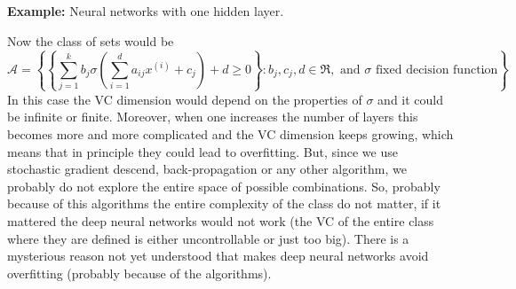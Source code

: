 \documentclass[11pt, english]{article}
\newcommand{\su}[2]{\sum\limits_{#1}^{#2}}
\begin{document}
\textbf{Example:} Neural networks with one hidden layer. \\

Now the class of sets would be 
\begin{equation}
	\mathcal{A}=\left\{\left\{\su{j=1}{k} b_j \sigma\left(\su{i=1}{d}a_{ij}x^{(i)}+c_j\right)+d\geq 0\right\}:b_j,c_j,d\in\Re,\text{ and }\sigma \text{ fixed decision function}\right\}.
\end{equation}
In this case the VC dimension would depend on the properties of $\sigma$ and it could be infinite or finite. Moreover, when one increases the number of layers this becomes more and more complicated and the VC dimension keeps growing, which means that in principle they could lead to overfitting. But, since we use stochastic gradient descend, back-propagation or any other algorithm, we probably do not explore the entire space of possible combinations. So, probably because of this algorithms the entire complexity of the class do not matter, if it mattered the deep neural networks would not work (the VC of the entire class where they are defined is either uncontrollable or just too big). There is a mysterious reason not yet understood that makes deep neural networks avoid overfitting (probably because of the algorithms).\\
\end{document}

